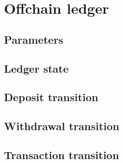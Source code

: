 \documentclass[../hydrozoa.tex]{subfiles}
\begin{document}
\chapter{Offchain ledger}%
\label{h:offchain-ledger}

\section{Parameters}%
\label{h:ledger-parameters}

\section{Ledger state}%
\label{h:ledger-state}

\section{Deposit transition}%
\label{h:ledger-deposit}

\section{Withdrawal transition}%
\label{h:ledger-withdrawal}

\section{Transaction transition}%
\label{h:ledger-transaction}
\end{document}
